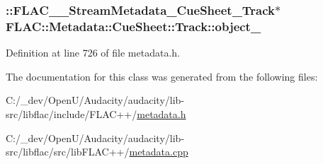 \subsubsection[{\texorpdfstring{object\+\_\+}{object_}}]{\setlength{\rightskip}{0pt plus 5cm}\+::{\bf F\+L\+A\+C\+\_\+\+\_\+\+Stream\+Metadata\+\_\+\+Cue\+Sheet\+\_\+\+Track}$\ast$ F\+L\+A\+C\+::\+Metadata\+::\+Cue\+Sheet\+::\+Track\+::object\+\_\+\hspace{0.3cm}{\ttfamily [protected]}}\hypertarget{class_f_l_a_c_1_1_metadata_1_1_cue_sheet_1_1_track_ab626deaf593475e4499c50594ed09b7f}{}\label{class_f_l_a_c_1_1_metadata_1_1_cue_sheet_1_1_track_ab626deaf593475e4499c50594ed09b7f}


Definition at line 726 of file metadata.\+h.



The documentation for this class was generated from the following files\+:\begin{DoxyCompactItemize}
\item 
C\+:/\+\_\+dev/\+Open\+U/\+Audacity/audacity/lib-\/src/libflac/include/\+F\+L\+A\+C++/\hyperlink{include_2_f_l_a_c_09_09_2metadata_8h}{metadata.\+h}\item 
C\+:/\+\_\+dev/\+Open\+U/\+Audacity/audacity/lib-\/src/libflac/src/lib\+F\+L\+A\+C++/\hyperlink{lib_f_l_a_c_09_09_2metadata_8cpp}{metadata.\+cpp}\end{DoxyCompactItemize}
